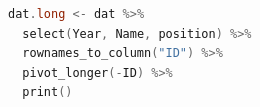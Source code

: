 \begin{lstlisting}[language=c++,label={code:usingR_pivot_longer},caption={ロング型にする関数}]
dat.long <- dat %>%
  select(Year, Name, position) %>%
  rownames_to_column("ID") %>%
  pivot_longer(-ID) %>%
  print() 
\end{lstlisting}
